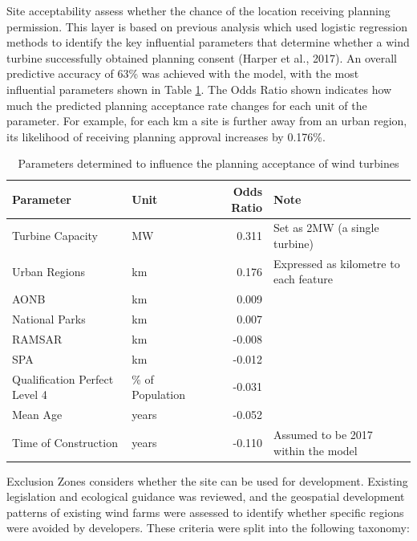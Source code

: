 \documentclass[a4paper,]{article}
\theoremstyle{definition}
\theoremstyle{definition}
\theoremstyle{remark}
\begin{document}
{Site acceptability assess whether the chance of the location receiving
planning permission. This layer is based on previous analysis which used
logistic regression methods to identify the key influential parameters
that determine whether a wind turbine successfully obtained planning
consent (Harper et al., 2017). An overall predictive accuracy of 63\%
was achieved with the model, with the most influential parameters shown
in Table \ref{tab:TableofParameters}. The Odds Ratio shown indicates how
much the predicted planning acceptance rate changes for each unit of the
parameter. For example, for each km a site is further away from an urban
region, its likelihood of receiving planning approval increases by
0.176\%.

\begin{table}

\caption{\label{tab:TableofParameters}Parameters determined to influence the planning acceptance of wind turbines}
\centering
\begin{tabular}[t]{llrl}
\toprule
Parameter & Unit & Odds Ratio & Note\\
\midrule
Turbine Capacity & MW & 0.311 & Set as 2MW (a single turbine)\\
Urban Regions & km & 0.176 & Expressed as kilometre to each feature\\
AONB & km & 0.009 & \\
National Parks & km & 0.007 & \\
RAMSAR & km & -0.008 & \\
\addlinespace
SPA & km & -0.012 & \\
Qualification Perfect Level 4 & \% of Population & -0.031 & \\
Mean Age & years & -0.052 & \\
Time of Construction & years & -0.110 & Assumed to be 2017 within the model\\
\bottomrule
\end{tabular}
\end{table}

Exclusion Zones considers whether the site can be used for development.
Existing legislation and ecological guidance was reviewed, and the
geospatial development patterns of existing wind farms were assessed to
identify whether specific regions were avoided by developers. These
criteria were split into the following taxonomy:

}
\end{document}
